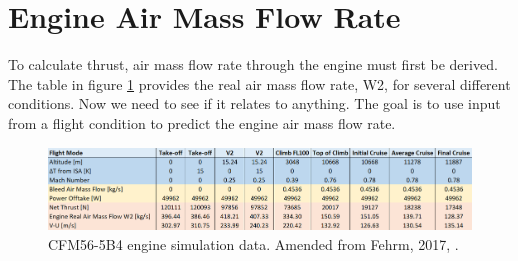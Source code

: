 \documentclass[english]{kththesis}
\begin{document}
\clearpage

\section{Engine Air Mass Flow Rate}

To calculate thrust, air mass flow rate through the engine must first be derived. The table in figure \ref{fig:CFM56-5B4GasturbTable} provides the real air mass flow rate, W2, for several different conditions. Now we need to see if it relates to anything. The goal is to use input from a flight condition to predict the engine air mass flow rate.

\begin{figure}[hb]
    \centering
    \includegraphics[width=1\textwidth]{Epictures/CFM56-5B4 GasTurb Data Fehrm.png}
    \caption{CFM56-5B4 engine simulation data. Amended from Fehrm, 2017, \cite{Fehrm2017}.}
    \label{fig:CFM56-5B4GasturbTable}
\end{figure}







\end{document}
